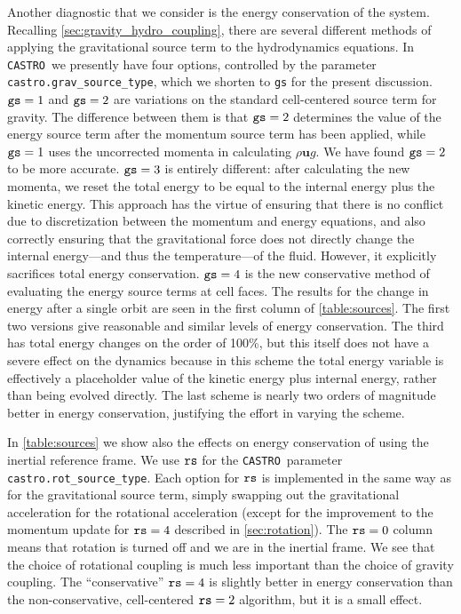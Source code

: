 \documentclass[iop,numberedappendix]{../emulateapj}
\newcommand{\castro}{\texttt{CASTRO}}
\begin{document}
Another diagnostic that we consider is the energy conservation of the
system. Recalling \autoref{sec:gravity_hydro_coupling}, there are
several different methods of applying the gravitational source term to
the hydrodynamics equations. In \castro\ we presently have four
options, controlled by the parameter {\tt castro.grav\_source\_type},
which we shorten to {\tt gs} for the present discussion. 
${\tt gs} = 1$ and ${\tt gs} = 2$ are variations on the standard 
cell-centered source term for gravity. The difference between them is that 
${\tt gs} = 2$ determines the value of the energy source term after the momentum
source term has been applied, while ${\tt gs} = 1$ uses the uncorrected
momenta in calculating $\rho \mathbf{u} g$. We have found ${\tt gs} = 2$ to be
more accurate. ${\tt gs} = 3$ is entirely different: after calculating
the new momenta, we reset the total energy to be equal to the internal
energy plus the kinetic energy. This approach has the virtue of ensuring that
there is no conflict due to discretization between the momentum and
energy equations, and also correctly ensuring that the gravitational
force does not directly change the internal energy---and thus the
temperature---of the fluid. However, it explicitly sacrifices total
energy conservation. ${\tt gs} = 4$ is the new conservative method of
evaluating the energy source terms at cell faces. The results for the
change in energy after a single orbit are seen in the first column of
\autoref{table:sources}. The first two versions give reasonable and
similar levels of energy conservation. The third has total energy
changes on the order of 100\%, but this itself does not have a severe
effect on the dynamics because in this scheme the total energy
variable is effectively a placeholder value of the kinetic energy plus
internal energy, rather than being evolved directly. The last scheme
is nearly two orders of magnitude better in energy conservation,
justifying the effort in varying the scheme.

In \autoref{table:sources} we show also the effects on energy conservation of using the inertial reference frame. 
We use ${\tt rs}$ for the \castro\ parameter {\tt castro.rot\_source\_type}.
Each option for ${\tt rs}$ is implemented in the same way as for
the gravitational source term, simply swapping out the gravitational acceleration
for the rotational acceleration (except for the improvement to the momentum update
for ${\tt rs} = 4$ described in \autoref{sec:rotation}). 
The ${\tt rs} = 0$ column means that rotation is turned off and we are 
in the inertial frame. We see that the choice of rotational coupling is much less important than the choice of gravity coupling. 
The ``conservative'' ${\tt rs} = 4$ is slightly better in energy conservation than the non-conservative, 
cell-centered ${\tt rs} = 2$ algorithm, but it is a small effect.
\end{document}
